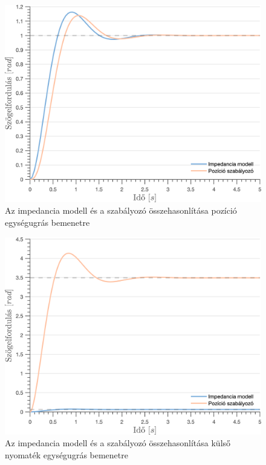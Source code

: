 \begin{figure}[ht]
    \begin{center}
    \includegraphics[width=\textwidth]{images/observer_controller_pos_resp.png}
    \caption{Az impedancia modell és a szabályozó összehasonlítása pozíció egységugrás bemenetre}\label{fig:observer_controller_pos_resp}
    \end{center}
\end{figure}

\begin{figure}[ht]
    \begin{center}
    \includegraphics[width=\textwidth]{images/observer_controller_torque_resp.png}
    \caption{Az impedancia modell és a szabályozó összehasonlítása külső nyomaték egységugrás bemenetre}\label{fig:observer_controller_torque_resp}
    \end{center}
\end{figure}


